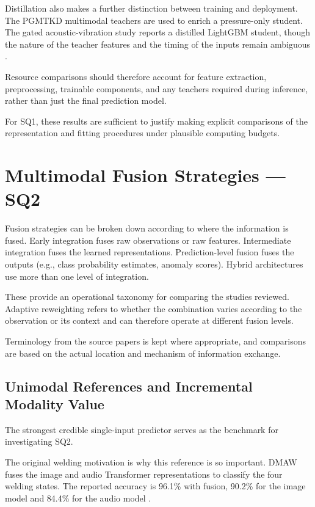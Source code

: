 Distillation also makes a further distinction between training and deployment. The PGMTKD multimodal
teachers are used to enrich a pressure-only student. The gated acoustic-vibration study reports a
distilled LightGBM student, though the nature of the teacher features and the timing of the inputs
remain ambiguous \parencite{Li2025PGMTKD,Huang2026Rolling}.

Resource comparisons should therefore account for feature extraction, preprocessing, trainable
components, and any teachers required during inference, rather than just the final prediction model.

For SQ1, these results are sufficient to justify making explicit comparisons of the representation
and fitting procedures under plausible computing budgets.

\section{Multimodal Fusion Strategies --- SQ2}

Fusion strategies can be broken down according to where the information is fused. Early integration
fuses raw observations or raw features. Intermediate integration fuses the learned representations.
Prediction-level fusion fuses the outputs (e.g., class probability estimates, anomaly scores).
Hybrid architectures use more than one level of integration.

These provide an operational taxonomy for comparing the studies reviewed. Adaptive reweighting
refers to whether the combination varies according to the observation or its context and can
therefore operate at different fusion levels.

Terminology from the source papers is kept where appropriate, and comparisons are based on the
actual location and mechanism of information exchange.

\subsection{Unimodal References and Incremental Modality Value}

The strongest credible single-input predictor serves as the benchmark for investigating SQ2.

The original welding motivation is why this reference is so important. DMAW fuses the image and
audio Transformer representations to classify the four welding states. The reported accuracy is
96.1\% with fusion, 90.2\% for the image model and 84.4\% for the audio model \parencite[PDF p.~7,
Table~III]{P003}.

